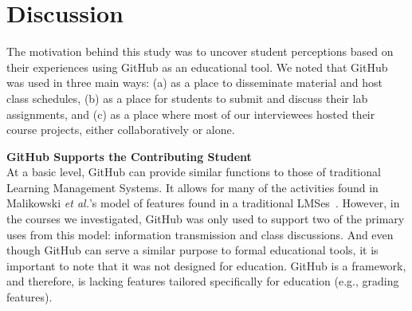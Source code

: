 \section{Discussion}
The motivation behind this study was to uncover student perceptions based on their experiences using GitHub as an educational tool. We noted that GitHub was used in three main ways: (a) as a place to disseminate material and host class schedules, (b) as a place for students to submit and discuss their lab assignments, and (c) as a place where most of our interviewees hosted their course projects, either collaboratively or alone.




\textbf{GitHub Supports the Contributing Student} \\
At a basic level, GitHub can provide similar functions to those of traditional Learning Management Systems. It allows for many of the activities found in Malikowski \textit{et al.}'s model of features found in a traditional LMSes~\cite{malikowski2007model}. However, in the courses we investigated, GitHub was only used to support two of the primary uses from this model: information transmission and class discussions. And even though GitHub can serve a similar purpose to formal educational tools, it is important to note that it was not designed for education. GitHub is a framework, and therefore, is lacking features tailored specifically for education (e.g., grading features).

